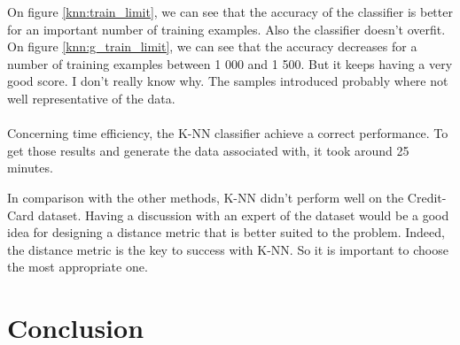 \documentclass[10pt]{article}
\begin{document}
			On figure \ref{knn:train_limit}, we can see that the accuracy of the classifier is better for an important number of training examples. Also the classifier doesn't overfit. On figure \ref{knn:g_train_limit}, we can see that the accuracy decreases for a number of training examples between 1 000 and 1 500. But it keeps having a very good score. I don't really know why. The samples introduced probably where not well representative of the data.

		\paragraph*{}
			Concerning time efficiency, the K-NN classifier achieve a correct performance. To get those results and generate the data associated with, it took around 25 minutes.

			In comparison with the other methods, K-NN didn't  perform well on the Credit-Card dataset. Having a discussion with an expert of the dataset would be a good idea for designing a distance metric that is better suited to the problem. Indeed, the distance metric is the key to success with K-NN. So it is important to choose the most appropriate one.
	\section{Conclusion}
		\paragraph*{}
\end{document}

